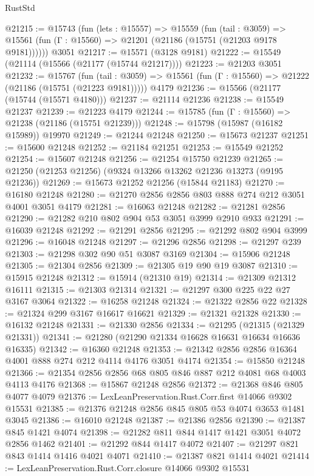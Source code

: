 \begin{lexlean}{RustStd}
\begin{coremodule}
@21215 := @15743
    (fun (lets : @15557) =>
    @15559
      (fun (tail : @3059) =>
      @15561 (fun (Γ : @15560) => @21201 (@21186 (@15751 (@21203 @9178 @9181))))))
    @3051
@21217 := @15571 (@3128 @9181)
@21222 := @15549 (@21114 (@15566 (@21177 (@15744 @21217))))
@21223 := @21203 @3051
@21232 := @15767
    (fun (tail : @3059) => @15561 (fun (Γ : @15560) => @21222 (@21186 (@15751 (@21223 @9181)))))
    @4179
@21236 := @15566 (@21177 (@15744 (@15571 @4180)))
@21237 := @21114 @21236
@21238 := @15549 @21237
@21239 := @21223 @4179
@21244 := @15785 (fun (Γ : @15560) => @21238 (@21186 (@15751 @21239)))
@21248 := @15798 (@15987 (@16182 @15989)) @19970
@21249 := @21244 @21248
@21250 := @15673 @21237
@21251 := @15600 @21248
@21252 := @21184 @21251
@21253 := @15549 @21252
@21254 := @15607 @21248
@21256 := @21254 @15750 @21239
@21265 := @21250 (@21253 @21256) (@9324 @13266 @13262 @21236 @13273 (@9195 @21236))
@21269 := @15673 @21252 @21256 (@15844 @21183)
@21270 := @16180 @21248
@21280 := @21270 @2856 @2856 @803 @888 @274 @212 @3051 @4001 @3051 @4179
@21281 := @16063 @21248
@21282 := @21281 @2856
@21290 := @21282 @210 @802 @904 @53 @3051 @3999 @2910 @933
@21291 := @16039 @21248
@21292 := @21291 @2856
@21295 := @21292 @802 @904 @3999
@21296 := @16048 @21248
@21297 := @21296 @2856
@21298 := @21297 @239
@21303 := @21298 @302 @90 @51 @3087 @3169
@21304 := @15906 @21248
@21305 := @21304 @2856
@21309 := @21305 @19 @90 @19 @3087
@21310 := @15915 @21248
@21312 := @15914 (@21310 @19)
@21314 := @21309 @21312 @16111
@21315 := @21303 @21314
@21321 := @21297 @300 @225 @22 @27 @3167 @3064
@21322 := @16258 @21248
@21324 := @21322 @2856 @22
@21328 := @21324 @299 @3167 @16617 @16621
@21329 := @21321 @21328
@21330 := @16132 @21248
@21331 := @21330 @2856
@21334 := @21295 (@21315 (@21329 @21331))
@21341 := @21280 (@21290 @21334 @16628 @16631 @16634 @16636 @16335)
@21342 := @16360 @21248
@21353 := @21342 @2856 @2856 @16364 @4001 @888 @274 @212 @4114 @4176 @3051 @4174
@21354 := @15850 @21248
@21366 := @21354 @2856 @2856 @68 @805 @846 @887 @212 @4081 @68 @4003 @4113 @4176
@21368 := @15867 @21248 @2856
@21372 := @21368 @846 @805 @4077 @4079
@21376 := LexLeanPreservation.Rust.Corr.first @14066 @9302 @15531
@21385 := @21376 @21248 @2856 @845 @805 @53 @4074 @3653 @1481 @3045
@21386 := @16010 @21248
@21387 := @21386 @2856
@21390 := @21387 @845 @1421 @4074
@21398 := @21282 @811 @844 @1417 @1421 @3051 @4072 @2856 @1462
@21401 := @21292 @844 @1417 @4072
@21407 := @21297 @821 @843 @1414 @1416 @4021 @4071
@21410 := @21387 @821 @1414 @4021
@21414 := LexLeanPreservation.Rust.Corr.closure @14066 @9302 @15531

\end{coremodule}
\end{lexlean}
